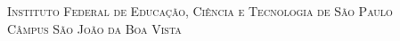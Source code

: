 {
    \thispagestyle{empty}
    
    \center
    
    \vspace*{4.5cm}
    \noindent
    \chaptitlefont\HUGE\textsc{\thetitle}
    
    \vspace{4.5cm}
    \noindent
    \chaptitlefont\Large\textsc{\theauthor}
    
    \chaptitlefont\tiny\textsc{Instituto Federal de Educação, Ciência e Tecnologia de São Paulo}\\
    \chaptitlefont\tiny\textsc{Câmpus São João da Boa Vista}
        
    \vfill
    \restoregeometry
}